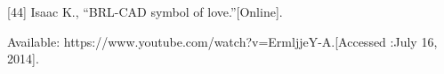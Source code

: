 \documentclass[11pt, oneside]{Thesis} %
\begin{document}
[44] Isaac K., “BRL-CAD symbol of love.”[Online].

Available: https://www.youtube.com/watch?v=ErmljjeY-A.[Accessed :July 16, 2014].







\backmatter

\appendix %



\end{document}
